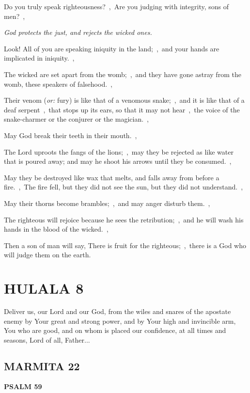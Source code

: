 \documentclass[12pt,twoside,a5paper]{article}
\newcommand{\hulala}[1]{\section*{HULALA {#1}}}
\newcommand{\marmita}[1]{\subsection*{MARMITA {#1}}}
\newcommand{\psalm}[1]{\textbf{PSALM {#1}}\nopagebreak}
\newcommand{\qanona}[1]{{\liturgicalhint{Qanona.} \emph{#1}}}
\newcommand{\slota}[1]{\liturgicalhint{Slota.} #1}
\newcommand{\translationoption}[1]{\emph{or:} #1}
\begin{document}
\begin{normalparskip}
  Do you truly speak righteousness?~\sep\ Are you judging with integrity, sons of men?~\sep

  \qanona{God protects the just, and rejects the wicked ones.}

  Look! All of you are speaking iniquity in the land;~\sep\ and your hands are implicated in iniquity.~\sep

  The wicked are set apart from the womb;~\sep\ and they have gone astray from the womb, these speakers of falsehood.~\sep

  Their venom (\translationoption{fury}) is like that of a venomous snake;~\sep\ and it is like that of a deaf serpent~\sep\ that stops up its ears, so that it may not hear~\sep\ the voice of the snake-charmer or the conjurer or the magician.~\sep

  May God break their teeth in their mouth.~\sep

  The Lord uproots the fangs of the lions;~\sep\ may they be rejected as like water that is poured away; and may he shoot his arrows until they be consumed.~\sep

  May they be destroyed like wax that melts, and falls away from before a fire.~\sep\ The fire fell, but they did not see the sun, but they did not understand.~\sep

  May their thorns become brambles;~\sep\ and may anger disturb them.~\sep

  The righteous will rejoice because he sees the retribution;~\sep\ and he will wash his hands in the blood of the wicked.~\sep

  Then a son of man will say, There is fruit for the righteous;~\sep\ there is a God who will judge them on the earth.
\end{normalparskip}


\hulala{8}

\slota{Deliver us, our Lord and our God, from the wiles and snares of the apostate enemy by Your great and strong power, and by Your high and invincible arm, You who are good, and on whom is placed our confidence, at all times and seasons, Lord of all, Father...}

\marmita{22}

\psalm{59}
\end{document}
